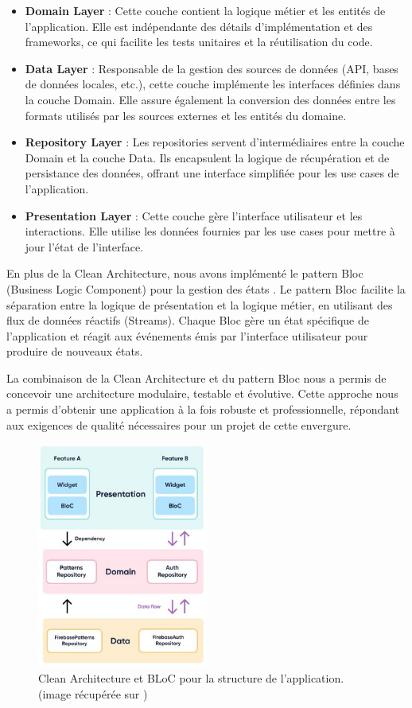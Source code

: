 \begin{itemize}[noitemsep]
    \item \textbf{Domain Layer} : Cette couche contient la logique métier et les entités de l'application. Elle est indépendante des détails d'implémentation et des frameworks, ce qui facilite les tests unitaires et la réutilisation du code.
    \item \textbf{Data Layer} : Responsable de la gestion des sources de données (API, bases de données locales, etc.), cette couche implémente les interfaces définies dans la couche Domain. Elle assure également la conversion des données entre les formats utilisés par les sources externes et les entités du domaine.
    \item \textbf{Repository Layer} : Les repositories servent d'intermédiaires entre la couche Domain et la couche Data. Ils encapsulent la logique de récupération et de persistance des données, offrant une interface simplifiée pour les use cases de l'application.
    \item \textbf{Presentation Layer} : Cette couche gère l'interface utilisateur et les interactions. Elle utilise les données fournies par les use cases pour mettre à jour l'état de l'interface.
\end{itemize}

En plus de la Clean Architecture, nous avons implémenté le pattern Bloc (Business Logic Component) pour la gestion des états \cite{blocPattern}. Le pattern Bloc facilite la séparation entre la logique de présentation et la logique métier, en utilisant des flux de données réactifs (Streams). Chaque Bloc gère un état spécifique de l'application et réagit aux événements émis par l'interface utilisateur pour produire de nouveaux états.

La combinaison de la Clean Architecture et du pattern Bloc nous a permis de concevoir une architecture modulaire, testable et évolutive. Cette approche nous a permis d'obtenir une application à la fois robuste et professionnelle, répondant aux exigences de qualité nécessaires pour un projet de cette envergure.


\begin{figure}[H]
    \centering
    \includegraphics[width=0.5\textwidth]{images/firebase-architecture-BLoC.jpeg}
    \caption{Clean Architecture et BLoC pour la structure de l'application. (image récupérée sur \cite{googleCloudArchitecture})
    }
    \label{fig:architecture}
\end{figure}